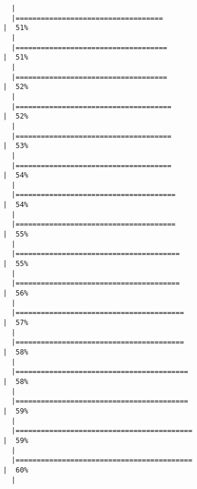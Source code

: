 \documentclass[
  letterpaper,
]{book}
\begin{document}
\begin{verbatim}
  |                                                                            
  |===================================                                   |  51%
  |                                                                            
  |====================================                                  |  51%
  |                                                                            
  |====================================                                  |  52%
  |                                                                            
  |=====================================                                 |  52%
  |                                                                            
  |=====================================                                 |  53%
  |                                                                            
  |=====================================                                 |  54%
  |                                                                            
  |======================================                                |  54%
  |                                                                            
  |======================================                                |  55%
  |                                                                            
  |=======================================                               |  55%
  |                                                                            
  |=======================================                               |  56%
  |                                                                            
  |========================================                              |  57%
  |                                                                            
  |========================================                              |  58%
  |                                                                            
  |=========================================                             |  58%
  |                                                                            
  |=========================================                             |  59%
  |                                                                            
  |==========================================                            |  59%
  |                                                                            
  |==========================================                            |  60%
  |                                                                            

\end{verbatim}
\end{document}
